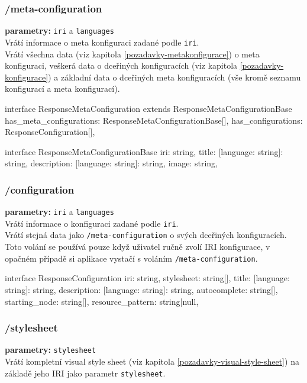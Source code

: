 \subsubsection{/meta-configuration}
\textbf{parametry:} \texttt{iri} a \texttt{languages} \\
Vrátí informace o meta konfiguraci zadané podle \texttt{iri}. \\
Vrátí všechna data (viz kapitola \ref{pozadavky-metakonfigurace}) o meta konfiguraci, veškerá data o dceřiných konfiguracích (viz kapitola \ref{pozadavky-konfigurace}) a základní data o dceřiných meta konfiguracích (vše kromě seznamu konfigurací a meta konfigurací).

\begin{code}
interface ResponseMetaConfiguration extends
ResponseMetaConfigurationBase {
    has_meta_configurations: ResponseMetaConfigurationBase[],
    has_configurations: ResponseConfiguration[],
}

interface ResponseMetaConfigurationBase {
    iri: string,
    title: {[language: string]: string},
    description: {[language: string]: string},
    image: string,
}
\end{code}

\subsubsection{/configuration}
\textbf{parametry:} \texttt{iri} a \texttt{languages} \\
Vrátí informace o konfiguraci zadané podle \texttt{iri}. \\
Vrátí stejná data jako \texttt{/meta-configuration} o svých dceřiných konfiguracích. \\
Toto volání se používá pouze když uživatel ručně zvolí IRI konfigurace, v opačném případě si aplikace vystačí s voláním \texttt{/meta-configuration}.

\begin{code}
interface ResponseConfiguration {
    iri: string,
    stylesheet: string[],
    title: {[language: string]: string},
    description: {[language: string]: string},
    autocomplete: string[],
    starting_node: string[],
    resource_pattern: string|null,
}
\end{code}

\subsubsection{/stylesheet}
\textbf{parametry:} \texttt{stylesheet} \\
Vrátí kompletní visual style sheet (viz kapitola \ref{pozadavky-visual-style-sheet}) na základě jeho IRI jako parametr \texttt{stylesheet}.

